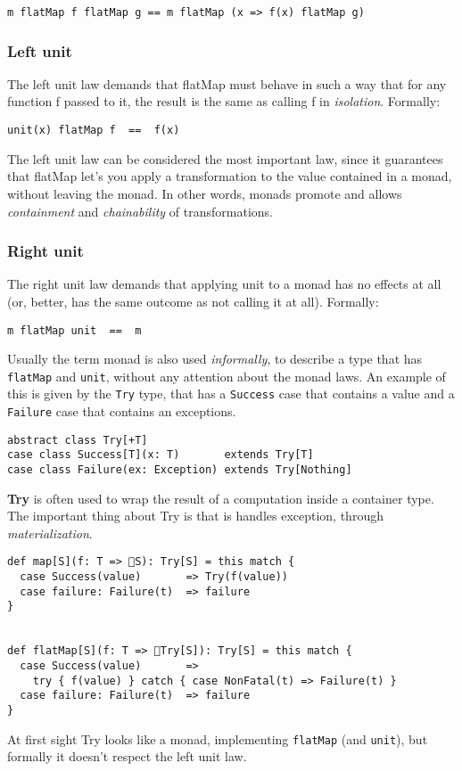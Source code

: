 \begin{verbatim}
m flatMap f flatMap g == m flatMap (x => f(x) flatMap g)
\end{verbatim}

\subsubsection{Left unit}\label{left-unit}

The left unit law demands that flatMap must behave in such a way that
for any function f passed to it, the result is the same as calling f in
\emph{isolation}. Formally:

\begin{verbatim}
unit(x) flatMap f  ==  f(x)
\end{verbatim}

The left unit law can be considered the most important law, since it
guarantees that flatMap let's you apply a transformation to the value
contained in a monad, without leaving the monad. In other words, monads
promote and allows \emph{containment} and \emph{chainability} of
transformations.

\subsubsection{Right unit}\label{right-unit}

The right unit law demands that applying unit to a monad has no effects
at all (or, better, has the same outcome as not calling it at all).
Formally:

\begin{verbatim}
m flatMap unit  ==  m
\end{verbatim}

Usually the term monad is also used \emph{informally}, to describe a
type that has \texttt{flatMap} and \texttt{unit}, without any attention
about the monad laws. An example of this is given by the \texttt{Try}
type, that has a \texttt{Success} case that contains a value and a
\texttt{Failure} case that contains an exceptions.

\begin{verbatim}
abstract class Try[+T]
case class Success[T](x: T)       extends Try[T]
case class Failure(ex: Exception) extends Try[Nothing]
\end{verbatim}

\textbf{Try} is often used to wrap the result of a computation inside a
container type. The important thing about Try is that is handles
exception, through \emph{materialization}.

\begin{verbatim}
def map[S](f: T => 􏰀S): Try[S] = this match {
  case Success(value)       => Try(f(value))
  case failure: Failure(t)  => failure
}


def flatMap[S](f: T => 􏰀Try[S]): Try[S] = this match {
  case Success(value)       =>
    try { f(value) } catch { case NonFatal(t) => Failure(t) }
  case failure: Failure(t)  => failure
}
\end{verbatim}

At first sight Try looks like a monad, implementing \texttt{flatMap}
(and \texttt{unit}), but formally it doesn't respect the left unit law.


